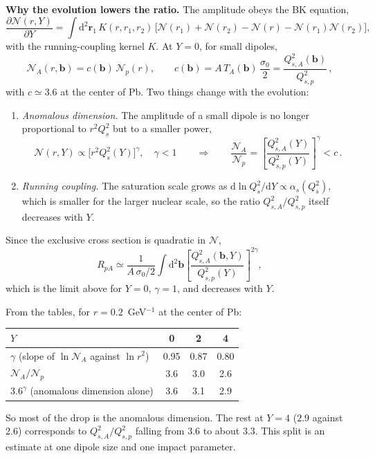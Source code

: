 \documentclass[12pt]{article}
\begin{document}
\textbf{Why the evolution lowers the ratio.} The amplitude obeys the BK equation,
\[
  \frac{\partial\mathcal{N}(r,Y)}{\partial Y}=\int\mathrm{d}^2\mathbf{r}_1\,K(r,r_1,r_2)\,
  \big[\mathcal{N}(r_1)+\mathcal{N}(r_2)-\mathcal{N}(r)-\mathcal{N}(r_1)\mathcal{N}(r_2)\big],
\]
with the running-coupling kernel $K$. At $Y=0$, for small dipoles,
\[
  \mathcal{N}_A(r,\mathbf{b})=c(\mathbf{b})\,\mathcal{N}_p(r),\qquad
  c(\mathbf{b})=A\,T_A(\mathbf{b})\,\frac{\sigma_0}{2}=\frac{Q_{s,A}^2(\mathbf{b})}{Q_{s,p}^2}\,,
\]
with $c\simeq3.6$ at the center of Pb. Two things change with the evolution:
\begin{enumerate}
\item \emph{Anomalous dimension.} The amplitude of a small dipole is no longer proportional to
$r^2Q_s^2$ but to a smaller power,
\[
  \mathcal{N}(r,Y)\propto\big[r^2Q_s^2(Y)\big]^{\gamma},\quad\gamma<1
  \qquad\Longrightarrow\qquad
  \frac{\mathcal{N}_A}{\mathcal{N}_p}=\left[\frac{Q_{s,A}^2(Y)}{Q_{s,p}^2(Y)}\right]^{\gamma}<c\,.
\]
\item \emph{Running coupling.} The saturation scale grows as
$\mathrm{d}\ln Q_s^2/\mathrm{d}Y\propto\alpha_s(Q_s^2)$, which is smaller for the larger nuclear scale,
so the ratio $Q_{s,A}^2/Q_{s,p}^2$ itself decreases with $Y$.
\end{enumerate}
Since the exclusive cross section is quadratic in $\mathcal{N}$,
\[
  R_{pA}\simeq\frac{1}{A\,\sigma_0/2}\int\mathrm{d}^2\mathbf{b}
  \left[\frac{Q_{s,A}^2(\mathbf{b},Y)}{Q_{s,p}^2(Y)}\right]^{2\gamma},
\]
which is the limit above for $Y=0$, $\gamma=1$, and decreases with $Y$.

From the tables, for $r=0.2$~GeV$^{-1}$ at the center of Pb:
\begin{center}
\begin{tabular}{lccc}
\toprule
$Y$ & 0 & 2 & 4 \\
\midrule
$\gamma$ (slope of $\ln\mathcal{N}_A$ against $\ln r^2$) & 0.95 & 0.87 & 0.80 \\
$\mathcal{N}_A/\mathcal{N}_p$ & 3.6 & 3.0 & 2.6 \\
$3.6^{\gamma}$ (anomalous dimension alone) & 3.6 & 3.1 & 2.9 \\
\bottomrule
\end{tabular}
\end{center}
So most of the drop is the anomalous dimension. The rest at $Y=4$ ($2.9$ against $2.6$) corresponds to
$Q_{s,A}^2/Q_{s,p}^2$ falling from $3.6$ to about $3.3$. This split is an estimate at one dipole size
and one impact parameter.
\end{document}
